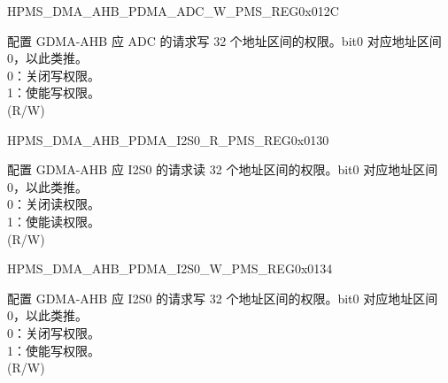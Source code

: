 \begin{register}{H}{PMS\_DMA\_AHB\_PDMA\_ADC\_W\_PMS\_REG}{0x012C}\label{regdesc:PMSDMAAHBPDMAADCWPMSREG}
%
\regnewline%
\begin{regdesc}\begin{reglist}
\label{fielddesc:PMSDMAAHBPDMAADCWPMS}\item [PMS\_DMA\_AHB\_PDMA\_ADC\_W\_PMS] 配置 GDMA-AHB 应 ADC 的请求写 32 个地址区间的权限。bit0 对应地址区间 0，以此类推。\\
0：关闭写权限。\\
1：使能写权限。\\ (R/W)
\end{reglist}\end{regdesc}
\end{register}


\begin{register}{H}{PMS\_DMA\_AHB\_PDMA\_I2S0\_R\_PMS\_REG}{0x0130}\label{regdesc:PMSDMAAHBPDMAI2S0RPMSREG}
%
\regnewline%
\begin{regdesc}\begin{reglist}
\label{fielddesc:PMSDMAAHBPDMAI2S0RPMS}\item [PMS\_DMA\_AHB\_PDMA\_I2S0\_R\_PMS] 配置 GDMA-AHB 应 I2S0 的请求读 32 个地址区间的权限。bit0 对应地址区间 0，以此类推。\\
0：关闭读权限。\\
1：使能读权限。\\ (R/W)
\end{reglist}\end{regdesc}
\end{register}


\begin{register}{H}{PMS\_DMA\_AHB\_PDMA\_I2S0\_W\_PMS\_REG}{0x0134}\label{regdesc:PMSDMAAHBPDMAI2S0WPMSREG}
%
\regnewline%
\begin{regdesc}\begin{reglist}
\label{fielddesc:PMSDMAAHBPDMAI2S0WPMS}\item [PMS\_DMA\_AHB\_PDMA\_I2S0\_W\_PMS] 配置 GDMA-AHB 应 I2S0 的请求写 32 个地址区间的权限。bit0 对应地址区间 0，以此类推。\\
0：关闭写权限。\\
1：使能写权限。\\ (R/W)
\end{reglist}\end{regdesc}
\end{register}


